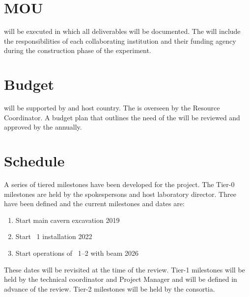 \section{MOU}
\label{sec:fdsp-coord-mou}

 will be executed in which all deliverables will be
documented. The  will include the responsibilities of each
collaborating institution and their funding agency during the
construction phase of the experiment.

\section{Budget}
\label{sec:fdsp-coord-budget}

  will be supported by  and host
country. The  is overseen by the Resource Coordinator.
A budget plan that outlines the need of the  will be reviewed and
approved by the  annually.

\section{Schedule}
\label{sec:fdsp-coord-controls}

A series of tiered milestones have been developed for the 
project. The Tier-0 milestones are held by the spokespersons and host
laboratory director. Three have been defined and the current milestones and
dates are:
\begin{enumerate}
\item Start main cavern excavation \hspace{2.58in} 2019
\item Start ~1 installation \hspace{2.1in} 2022
\item Start operations of ~1--2 with beam \hspace{1in} 2026
\end{enumerate}
These dates will be revisited at the time of the  review.  Tier-1
milestones will be held by the technical coordinator and  Project
Manager and will be defined in advance of the  review. Tier-2
milestones will be held by the consortia.

